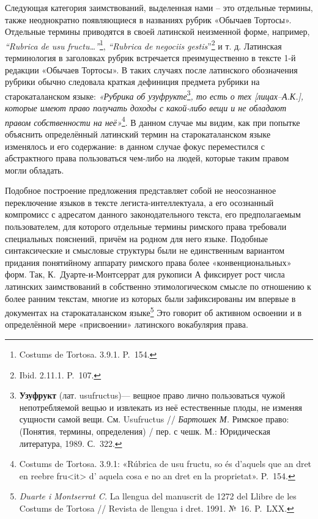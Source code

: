 Следующая категория заимствований, выделенная нами -- это отдельные термины, также неоднократно появляющиеся в названиях рубрик «Обычаев Тортосы». Отдельные термины приводятся в своей латинской неизменной форме, например, \emph{“}\emph{Rubrica}\emph{ }\emph{de}\emph{ }\emph{usu}\emph{ }\emph{fructu}\emph{…”}\footnote{Costums de Tortosa. 3.9.1. P.~154.}, \emph{“}\emph{Rubrica}\emph{ }\emph{de}\emph{ }\emph{negociis}\emph{ }\emph{gestis}”\footnote{Ibid. 2.11.1. P.~107.} и т. д. Латинская терминология в заголовках рубрик встречается преимущественно в тексте 1-й редакции «Обычаев Тортосы». В таких случаях после латинского обозначения рубрики обычно следовала краткая дефиниция предмета рубрики на старокаталанском языке: \emph{«Рубрика об узуфрукте}\footnote{\textbf{Узуфрукт} (лат. usufructus)--- вещное право лично пользоваться чужой непотребляемой вещью и извлекать из неё естественные плоды, не изменяя сущности самой вещи. См. Usufructus // \emph{Бартошек М. }Римское право: (Понятия, термины, определения) / пер. с чешк. М.: Юридическая литература, 1989. С.~322.}\emph{, то есть о тех [лицах--А.К.], которые имеют право получать доходы с какой-либо вещи и не обладают правом собственности на неё»}\footnote{Costums de Tortosa. 3.9.1: «Rúbrica de usu fructu, so és d'aquels que an dret en reebre fru<it> d' aquela cosa e no an dret en la proprietat». P.~154.}. В данном случае мы видим, как при попытке объяснить определённый латинский термин на старокаталанском языке изменялось и его содержание: в данном случае фокус переместился с абстрактного права пользоваться чем-либо на людей, которые таким правом могли обладать.

Подобное построение предложения представляет собой не неосознанное переключение языков в тексте легиста-интеллектуала, а его осознанный компромисс с адресатом данного законодательного текста, его предполагаемым пользователем, для которого отдельные термины римского права требовали специальных пояснений, причём на родном для него языке. Подобные синтаксические и смысловые структуры были не единственным вариантом придания понятийному аппарату римского права более «конвенциональных» форм. Так, К.~Дуарте-и-Монтсеррат для рукописи А фиксирует рост числа латинских заимствований в собственно этимологическом смысле по отношению к более ранним текстам, многие из которых были зафиксированы им впервые в документах на старокаталанском языке\footnote{\emph{Duarte i Montserrat C.} La llengua del manuscrit de 1272 del Llibre de les Costums de Tortosa // Revista de llengua i dret. 1991. №~16. P.~LXX.} Это говорит об активном освоении и в определённой мере «присвоении» латинского вокабулярия права.

